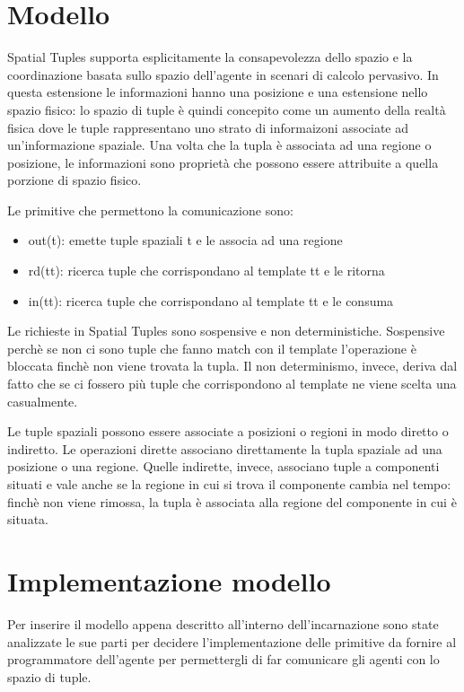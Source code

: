 \documentclass[12pt,a4paper,openright,twoside]{report}
\begin{document}
\section{Modello}\label{ModelloSpatialTuples}

Spatial Tuples supporta esplicitamente la consapevolezza dello spazio e la coordinazione basata sullo spazio dell'agente in scenari di calcolo pervasivo. In questa estensione le informazioni hanno una posizione e una estensione nello spazio fisico: lo spazio di tuple \`e quindi concepito come un aumento della realt\`a fisica dove le tuple rappresentano uno strato di informaizoni associate ad un'informazione spaziale.
Una volta che la tupla \`e associata ad una regione o posizione, le informazioni sono propriet\`a che possono essere attribuite a quella porzione di spazio fisico.

Le primitive che permettono la comunicazione sono:
\begin{itemize}
   \item out(t): emette tuple spaziali t e le associa ad una regione
   \item rd(tt): ricerca tuple che corrispondano al template tt e le ritorna
   \item in(tt): ricerca tuple che corrispondano al template tt e le consuma
\end{itemize}

Le richieste in Spatial Tuples sono sospensive e non deterministiche. Sospensive perch\`e se non ci sono tuple che fanno match con il template l'operazione \`e bloccata finch\`e non viene trovata la tupla. Il non determinismo, invece, deriva dal fatto che se ci fossero pi\`u tuple che corrispondono al template ne viene scelta una casualmente.

Le tuple spaziali possono essere associate a posizioni o regioni in modo diretto o indiretto. Le operazioni dirette associano direttamente la tupla spaziale ad una posizione o una regione. Quelle indirette, invece, associano tuple a componenti situati e vale anche se la regione in cui si trova il componente cambia nel tempo: finch\`e non viene rimossa, la tupla \`e associata alla regione del componente in cui \`e situata.


\section{Implementazione modello}
Per inserire il modello appena descritto all'interno dell'incarnazione sono state analizzate le sue parti per decidere l'implementazione delle primitive da fornire al programmatore dell'agente per permettergli di far comunicare gli agenti con lo spazio di tuple.
\end{document}
